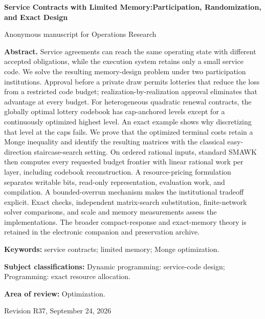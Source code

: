 \documentclass[11pt,letterpaper]{article}
\theoremstyle{definition}\newtheorem{assumption}[theorem]{Assumption}
\begin{document}
\hypersetup{pageanchor=false}
\begin{titlepage}\centering
{\Large\bfseries Service Contracts with Limited Memory:\newline Participation, Randomization, and Exact Design\par}
\vspace{.3in}Anonymous manuscript for Operations Research\par\vspace{.2in}
\begin{minipage}{\textwidth}
\textbf{Abstract.} Service agreements can reach the same operating state with different accepted obligations, while the execution system retains only a small service code. We solve the resulting memory-design problem under two participation institutions. Approval before a private draw permits lotteries that reduce the loss from a restricted code budget; realization-by-realization approval eliminates that advantage at every budget. For heterogeneous quadratic renewal contracts, the globally optimal lottery codebook has cap-anchored levels except for a continuously optimized highest level. An exact example shows why discretizing that level at the caps fails. We prove that the optimized terminal costs retain a Monge inequality and identify the resulting matrices with the classical easy-direction staircase-search setting. On ordered rational inputs, standard SMAWK then computes every requested budget frontier with linear rational work per layer, including codebook reconstruction. A resource-pricing formulation separates writable bits, read-only representation, evaluation work, and compilation. A bounded-overrun mechanism makes the institutional tradeoff explicit. Exact checks, independent matrix-search substitution, finite-network solver comparisons, and scale and memory measurements assess the implementations. The broader compact-response and exact-memory theory is retained in the electronic companion and preservation archive.
\par\vspace{.15in}\textbf{Keywords:} service contracts; limited memory; Monge optimization.
\par\vspace{.1in}\textbf{Subject classifications:} Dynamic programming: service-code design; Programming: exact resource allocation.
\par\vspace{.1in}\textbf{Area of review:} Optimization.
\end{minipage}\vfill Revision R37, September 24, 2026\end{titlepage}
\end{document}
